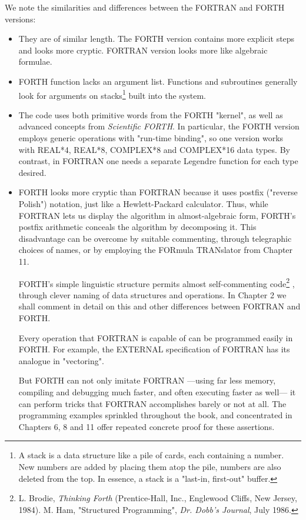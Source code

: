 We note the similarities and differences between the FORTRAN and FORTH versions:

\begin{itemize}
    \item They are of similar length. The FORTH version contains more explicit steps and looks more cryptic. FORTRAN version looks more like algebraic formulae.
    \item FORTH function lacks an argument list. Functions and subroutines generally look for arguments on stacks\footnote{A stack is a data structure like a pile of cards, each containing a number. New numbers are added by placing them atop the pile, numbers are also deleted from the top. In essence, a stack is a "last-in, first-out" buffer.} built into 
the system.
    \item The code uses both primitive words from the FORTH "kernel", as well as advanced concepts from \textit{Scientific FORTH}. In particular, the FORTH version employs generic operations with "run-time binding", so one version works with REAL*4, REAL*8, COMPLEX*8 and COMPLEX*16 data types. By contrast, in FORTRAN one needs a separate Legendre function for each type desired.
    \item FORTH looks more cryptic than FORTRAN because it uses postfix ("reverse Polish") notation, just like a Hewlett-Packard calculator. Thus, while FORTRAN lets us display the algorithm in almost-algebraic form, FORTH's postfix arithmetic conceals the algorithm by decomposing it. This disadvantage can be overcome by suitable commenting, through telegraphic choices of names, or by employing the FORmula TRANslator from Chapter 11.

FORTH's simple linguistic structure permits almost self-commenting code\footnote{L. Brodie, \textit{Thinking Forth} (Prentice-Hall, Inc., Englewood Cliffs, New Jersey, 1984). M. Ham, "Structured Programming", \textit{Dr. Dobb's Journal}, July 1986.} , through clever naming of data structures and operations. In Chapter 2 we shall comment in detail on this and other differences between FORTRAN and FORTH.
 
Every operation that FORTRAN is capable of can be programmed easily in FORTH. For example, the EXTERNAL specification of FORTRAN has its analogue in "vectoring".

But FORTH can not only imitate FORTRAN —using far less memory, compiling and debugging much faster, and often executing faster as well— it can perform tricks that FORTRAN accomplishes barely or not at all. The programming examples sprinkled throughout the book, and concentrated in Chapters 6, 8 and 11 offer repeated concrete proof for these assertions.


\end{itemize}
